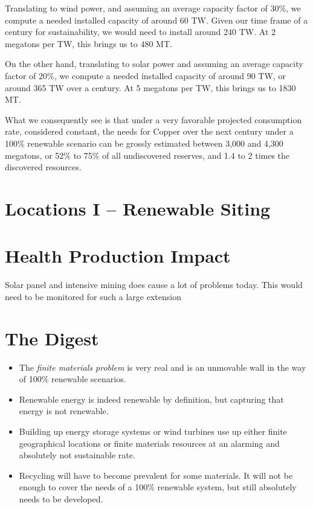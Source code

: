 Translating to wind power, and assuming an average capacity factor of 30\%, we compute a needed installed capacity of around 60 TW. Given our time frame of a century for sustainability, we would need to install around 240 TW. At 2 megatons per TW, this brings us to 480 MT.

On the other hand, translating to solar power and assuming an average capacity factor of 20\%, we compute a needed installed capacity of around 
90 TW, or around 365 TW over a century. At 5 megatons per TW, this brings us to 1830 MT.

What we consequently see is that under a very favorable projected consumption rate, considered constant, the needs for Copper over the next century under a 100\% renewable scenario can be grossly estimated between 3,000 and 4,300 megatons, or 52\% to 75\% of all undiscovered reserves, and 1.4 to 2 times the discovered resources.


\section{Locations I -- Renewable Siting}

\blindtext

\section{Health Production Impact}

Solar panel and intensive mining does cause a lot of problems today. This would need to be monitored for such a large extension

\blindtext



\section{The Digest}

\begin{kaoboxgreen}[frametitle=Main Takeaways]

\begin{itemize}
\item The \emph{finite materials problem} is very real and is an unmovable wall in the way of 100\% renewable scenarios.
\item Renewable energy is indeed renewable by definition, but capturing that energy is not renewable.
\item Building up energy storage systems or wind turbines use up either finite geographical locations or finite materials resources at an alarming and absolutely not sustainable rate.
\item Recycling will have to become prevalent for some materials. It will not be enough to cover the needs of a 100\% renewable system, but still absolutely needs to be developed.
\end{itemize}
  
\end{kaoboxgreen}